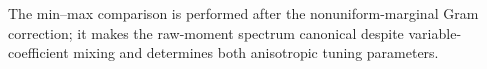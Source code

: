 The min--max comparison is performed after the nonuniform-marginal Gram correction; it makes the raw-moment spectrum canonical despite variable-coefficient mixing and determines both anisotropic tuning parameters.